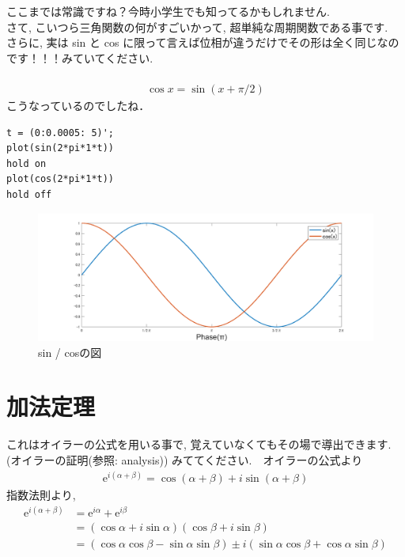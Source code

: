 \documentclass[11pt,a4paper,uplatex]{ujreport}
\begin{document}
ここまでは常識ですね？今時小学生でも知ってるかもしれません.\\

さて, こいつら三角関数の何がすごいかって, 超単純な周期関数である事です. \\

さらに, 実は sin と cos に限って言えば位相が違うだけでその形は全く同じなのです！！！みていてください.\\
\\
\begin{eqnarray}
\cos x = \sin (x + \pi/2)
\end{eqnarray}
こうなっているのでしたね．
\\

\begin{lstlisting}[caption=三角関数のMATLABコード,label=sc:tri]
t = (0:0.0005: 5)';
plot(sin(2*pi*1*t))
hold on
plot(cos(2*pi*1*t))
hold off
\end{lstlisting}


\begin{figure}[H]
\label{im:sincos}
  \centering
  \includegraphics[width=360mm,bb=0 0 1700 300]{../figures/sincos.png}
  \caption{sin / cosの図}
\end{figure}

\section{加法定理\label{addition_theorem}}
これはオイラーの公式を用いる事で, 覚えていなくてもその場で導出できます. (オイラーの証明(参照: analysis)) みててください.　オイラーの公式より
\begin{eqnarray}
\mathrm{e}^{i(\alpha + \beta)} = \cos (\alpha + \beta) + i\sin (\alpha + \beta)
\label{eq:aplusb}
\end{eqnarray}
指数法則より,
\begin{align}
\mathrm{e}^{i(\alpha + \beta)} &= \mathrm{e}^{i\alpha} + \mathrm{e}^{i\beta} \\ &= (\cos \alpha + i\sin\alpha)(\cos\beta + i\sin\beta) \\
&= (\cos\alpha\cos\beta - \sin\alpha\sin\beta)\pm i(\sin\alpha\cos\beta + \cos\alpha\sin\beta)
\label{eq:kahou}
\end{align}
\end{document}
